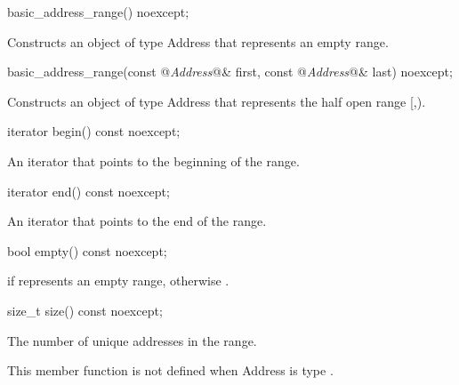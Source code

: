 \begin{itemdecl}
basic_address_range() noexcept;
\end{itemdecl}

\begin{itemdescr}
\pnum
\effects Constructs an object of type  Address\tcode{>} that represents an empty range.
\end{itemdescr}

\begin{itemdecl}
basic_address_range(const @\textit{Address}@& first,
                    const @\textit{Address}@& last) noexcept;
\end{itemdecl}

\begin{itemdescr}
\pnum
\effects Constructs an object of type Address\tcode{>} that represents the half open range [,).
\end{itemdescr}

\begin{itemdecl}
iterator begin() const noexcept;
\end{itemdecl}

\begin{itemdescr}
\pnum
\returns An iterator that points to the beginning of the range.
\end{itemdescr}

\begin{itemdecl}
iterator end() const noexcept;
\end{itemdecl}

\begin{itemdescr}
\pnum
\returns An iterator that points to the end of the range.
\end{itemdescr}

\begin{itemdecl}
bool empty() const noexcept;
\end{itemdecl}

\begin{itemdescr}
\pnum
\returns {} if  represents an empty range, otherwise .
\end{itemdescr}

\begin{itemdecl}
size_t size() const noexcept;
\end{itemdecl}

\begin{itemdescr}
\pnum
\returns The number of unique addresses in the range.

\pnum
\remarks This member function is not defined when Address is type .
\end{itemdescr}

